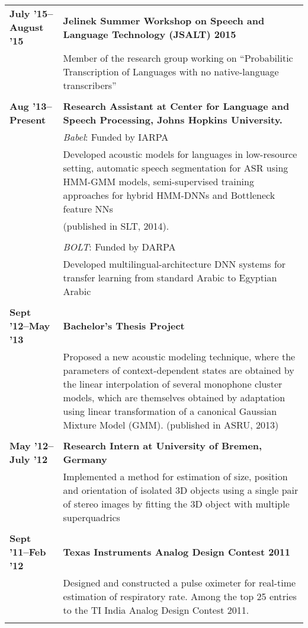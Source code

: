 \documentclass[margin,line,pifont,palatino,courier]{res}
\begin{document}
\begin{resume}
\begin{longtable}{@{}p{1.2in}p{3.8in}}
\textbf{July '15--August '15} & \textbf{Jelinek Summer Workshop on Speech and Language Technology (JSALT) 2015 } \\
& Member of the research group working on ``Probabilitic Transcription of Languages with no native-language transcribers''\\
&\\
\textbf{Aug '13--Present} & \textbf{Research Assistant at Center for Language and Speech Processing, Johns Hopkins University.} \\
&\textit{Babel}: Funded by IARPA \\
& Developed acoustic models for languages in low-resource setting, automatic
speech segmentation for ASR using HMM-GMM models, semi-supervised training
approaches for hybrid HMM-DNNs and Bottleneck feature NNs \\ & (published in
SLT, 2014). \\
&\\
&\textit{BOLT}: Funded by DARPA\\
& Developed multilingual-architecture DNN systems for transfer learning from standard Arabic to Egyptian Arabic\\
&\\
\textbf{Sept '12--May '13}& \textbf{Bachelor's Thesis Project}\\
& Proposed a new acoustic modeling technique, where the parameters of
context-dependent states are obtained by the linear interpolation of several
monophone cluster models, which are themselves obtained by adaptation using
linear transformation of a canonical Gaussian Mixture Model (GMM).
(published in ASRU, 2013)\\
&\\
\textbf{May '12--July '12}& \textbf{Research Intern at University of Bremen, Germany} \\
& Implemented a method for estimation of size, position and orientation of
isolated 3D objects using a single pair of stereo images by fitting the 3D
object with multiple superquadrics \\
&\\
\textbf{Sept '11--Feb '12}& \textbf{Texas Instruments Analog Design Contest
2011} \\
& Designed and constructed a pulse oximeter for real-time estimation of
respiratory rate. Among the top 25 entries to the TI India Analog Design Contest 2011.\\
&\\
\end{longtable}


\end{resume}
\end{document}
